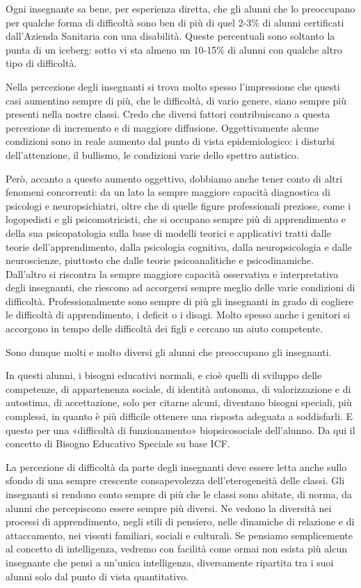 Ogni insegnante sa bene, per esperienza diretta, che gli alunni che lo preoccupano per
qualche forma di difficoltà sono ben di più di quel 2-3\% di alunni certificati dall'Azienda Sanitaria
con una disabilità. Queste percentuali sono soltanto la punta di un iceberg: sotto vi sta almeno un
10-15\% di alunni con qualche altro tipo di difficoltà.

Nella percezione degli insegnanti si trova molto spesso l'impressione che questi casi
aumentino sempre di più, che le difficoltà, di vario genere, siano sempre più presenti nella nostre
classi. Credo che diversi fattori contribuiscano a questa percezione di incremento e di maggiore
diffusione. Oggettivamente alcune condizioni sono in reale aumento dal punto di vista epidemiologico: i disturbi dell'attenzione, il bullismo, le condizioni varie dello spettro autistico.

Però, accanto a questo aumento oggettivo, dobbiamo anche tener conto di altri fenomeni
concorrenti: da un lato la sempre maggiore capacità diagnostica di psicologi e neuropsichiatri, oltre
che di quelle figure professionali preziose, come i logopedisti e gli psicomotricisti, che si occupano
sempre più di apprendimento e della sua psicopatologia sulla base di modelli teorici e applicativi
tratti dalle teorie dell'apprendimento, dalla psicologia cognitiva, dalla neuropsicologia e dalle
neuroscienze, piuttosto che dalle teorie psicoanalitiche e psicodinamiche. Dall'altro si riscontra la
sempre maggiore capacità osservativa e interpretativa degli insegnanti, che riescono ad accorgersi
sempre meglio delle varie condizioni di difficoltà. Professionalmente sono sempre di più gli
insegnanti in grado di cogliere le difficoltà di apprendimento, i deficit o i disagi. Molto spesso
anche i genitori si accorgono in tempo delle difficoltà dei figli e cercano un aiuto competente.

Sono dunque molti e molto diversi gli alunni che preoccupano gli insegnanti.

In questi alunni, i bisogni educativi normali, e cioè quelli di sviluppo delle competenze, di
appartenenza sociale, di identità autonoma, di valorizzazione e di autostima, di accettazione, solo
per citarne alcuni, diventano bisogni speciali, più complessi, in quanto è più difficile ottenere una
risposta adeguata a soddisfarli. E questo per una «difficoltà di funzionamento» biopsicosociale
dell'alunno. Da qui il concetto di Bisogno Educativo Speciale su base ICF.

La percezione di difficoltà da parte degli insegnanti deve essere letta anche sullo sfondo di una
sempre crescente consapevolezza dell'eterogeneità delle classi. Gli insegnanti si rendono conto
sempre di più che le classi sono abitate, di norma, da alunni che percepiscono essere sempre più
diversi. Ne vedono la diversità nei processi di apprendimento, negli stili di pensiero, nelle
dinamiche di relazione e di attaccamento, nei vissuti familiari, sociali e culturali. Se pensiamo
semplicemente al concetto di intelligenza, vedremo con facilità come ormai non esista più alcun
insegnante che pensi a un'unica intelligenza, diversamente ripartita tra i suoi alunni solo dal punto
di vista quantitativo.

